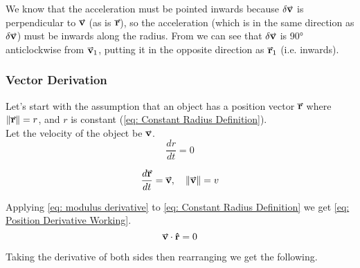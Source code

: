 \documentclass[main.tex]{subfiles}
\begin{document}
                    We know that the acceleration must be pointed inwards because $\delta \vect{v}$ is perpendicular to $\vect{v}$ (as is $\vect{r}$), so the acceleration (which is in the same direction as $\delta \vect{v}$) must be inwards along the radius. From  we can see that $\delta \vect{v}$ is 90\si{\degree} anticlockwise from $\vect{v}_1$, putting it in the opposite direction as $\vect{r}_1$ (i.e. inwards).

                \newpage
                \subsubsection{Vector Derivation}
                    \label{subsubsec: Vector Derivation of Centripetal Acceleration}

                    Let's start with the assumption that an object has a position vector $\vect{r}$ where $\vmod{\vect{r}} = r$, and $r$ is constant (\eqref{eq: Constant Radius Definition}).\\
                    Let the velocity of the object be $\vect{v}$.
                    \begin{equation}
                        \frac{dr}{dt} = 0
                        \label{eq: Constant Radius Definition}
                    \end{equation}

                    \begin{equation}
                        \frac{d\vect{r}}{dt} = \vect{v}, \hspace{1em} \vmod{\vect{v}}  = v
                    \end{equation}

                    Applying \eqref{eq: modulus derivative} to \eqref{eq: Constant Radius Definition} we get \eqref{eq: Position Derivative Working}.
                    \begin{equation}
                        \vect{v} \cdot \vhat{r} = 0
                        \label{eq: Position Derivative Working}
                    \end{equation}

                    Taking the derivative of both sides then rearranging we get the following.
\end{document}
